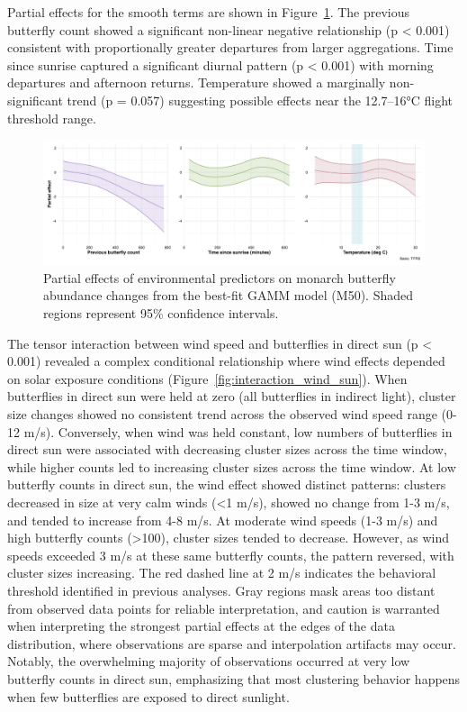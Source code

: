 

Partial effects for the smooth terms are shown in Figure~\ref{fig:partial_effects_30min}. The previous butterfly count showed a significant non-linear negative relationship (p < 0.001) consistent with proportionally greater departures from larger aggregations. Time since sunrise captured a significant diurnal pattern (p < 0.001) with morning departures and afternoon returns. Temperature showed a marginally non-significant trend (p = 0.057) suggesting possible effects near the 12.7–16°C flight threshold range.

\begin{figure}[htbp]
    \centering
    \includegraphics[width=\textwidth]{supplemental/results/30_min/figures/partial_effects_best_1x3.png}
    \caption{Partial effects of environmental predictors on monarch butterfly abundance changes from the best-fit GAMM model (M50). Shaded regions represent 95\% confidence intervals.}
    \label{fig:partial_effects_30min}
\end{figure}

The tensor interaction between wind speed and butterflies in direct sun (p < 0.001) revealed a complex conditional relationship where wind effects depended on solar exposure conditions (Figure~\ref{fig:interaction_wind_sun}). When butterflies in direct sun were held at zero (all butterflies in indirect light), cluster size changes showed no consistent trend across the observed wind speed range (0-12 m/s). Conversely, when wind was held constant, low numbers of butterflies in direct sun were associated with decreasing cluster sizes across the time window, while higher counts led to increasing cluster sizes across the time window. At low butterfly counts in direct sun, the wind effect showed distinct patterns: clusters decreased in size at very calm winds (<1 m/s), showed no change from 1-3 m/s, and tended to increase from 4-8 m/s. At moderate wind speeds (1-3 m/s) and high butterfly counts (>100), cluster sizes tended to decrease. However, as wind speeds exceeded 3 m/s at these same butterfly counts, the pattern reversed, with cluster sizes increasing. The red dashed line at 2 m/s indicates the behavioral threshold identified in previous analyses. Gray regions mask areas too distant from observed data points for reliable interpretation, and caution is warranted when interpreting the strongest partial effects at the edges of the data distribution, where observations are sparse and interpolation artifacts may occur. Notably, the overwhelming majority of observations occurred at very low butterfly counts in direct sun, emphasizing that most clustering behavior happens when few butterflies are exposed to direct sunlight. 


